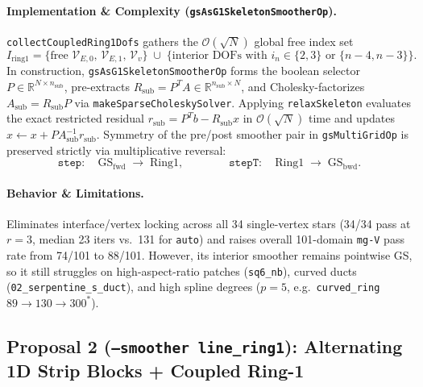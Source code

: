 \documentclass[10pt,a4paper]{article}
\begin{document}
\paragraph{Implementation \& Complexity (\texttt{gsAsG1SkeletonSmootherOp}).}
\texttt{collectCoupledRing1Dofs} gathers the $\mathcal{O}(\sqrt{N})$ global free index set
\[
  I_{\text{ring1}} = \{\text{free }\mathcal{V}_{E,0},\,\mathcal{V}_{E,1},\,\mathcal{V}_v\} \;\cup\; \{\text{interior DOFs with } i_n \in \{2,3\} \text{ or } \{n-4,n-3\}\}.
\]
In construction, \texttt{gsAsG1SkeletonSmootherOp} forms the boolean selector $P \in \mathbb{R}^{N \times n_{\text{sub}}}$, pre-extracts $R_{\text{sub}} = P^T A \in \mathbb{R}^{n_{\text{sub}} \times N}$, and Cholesky-factorizes $A_{\text{sub}} = R_{\text{sub}} P$ via \texttt{makeSparseCholeskySolver}. Applying \texttt{relaxSkeleton} evaluates the exact restricted residual $r_{\text{sub}} = P^T b - R_{\text{sub}} x$ in $\mathcal{O}(\sqrt{N})$ time and updates $x \leftarrow x + P A_{\text{sub}}^{-1} r_{\text{sub}}$. Symmetry of the pre/post smoother pair in \texttt{gsMultiGridOp} is preserved strictly via multiplicative reversal:
\[
  \texttt{step}: \quad \text{GS}_{\text{fwd}} \;\to\; \text{Ring1}, \qquad\qquad
  \texttt{stepT}: \quad \text{Ring1} \;\to\; \text{GS}_{\text{bwd}}.
\]

\paragraph{Behavior \& Limitations.}
Eliminates interface/vertex locking across all 34 single-vertex stars (34/34 pass at $r=3$, median 23 iters vs.\ 131 for \texttt{auto}) and raises overall 101-domain \texttt{mg-V} pass rate from 74/101 to 88/101. However, its interior smoother remains pointwise GS, so it still struggles on high-aspect-ratio patches (\texttt{sq6\_nb}), curved ducts (\texttt{02\_serpentine\_s\_duct}), and high spline degrees ($p=5$, e.g.\ \texttt{curved\_ring} $89 \to 130 \to 300^*$).

\subsection{Proposal 2 (\texttt{--smoother line\_ring1}): Alternating 1D Strip Blocks + Coupled Ring-1}
\end{document}
